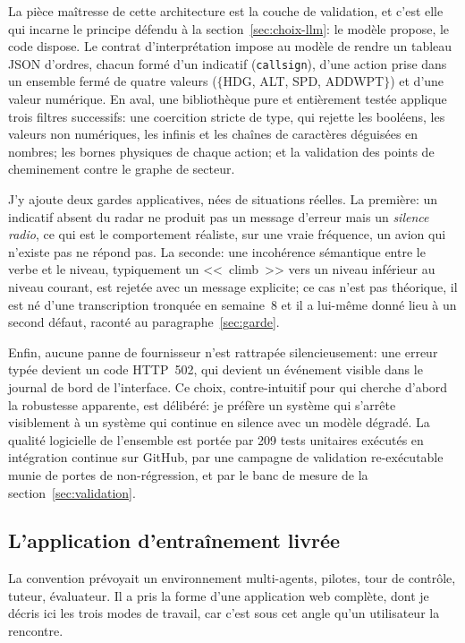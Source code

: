 \documentclass[11pt,a4paper]{article}
\begin{document}
La pièce maîtresse de cette architecture est la couche de validation, et c'est elle qui incarne le principe défendu à la section~\ref{sec:choix-llm}: le modèle propose, le code dispose. Le contrat d'interprétation impose au modèle de rendre un tableau JSON d'ordres, chacun formé d'un indicatif (\texttt{callsign}), d'une action prise dans un ensemble fermé de quatre valeurs ($\{$HDG, ALT, SPD, ADDWPT$\}$) et d'une valeur numérique. En aval, une bibliothèque pure et entièrement testée applique trois filtres successifs: une coercition stricte de type, qui rejette les booléens, les valeurs non numériques, les infinis et les chaînes de caractères déguisées en nombres; les bornes physiques de chaque action; et la validation des points de cheminement contre le graphe de secteur.

J'y ajoute deux gardes applicatives, nées de situations réelles. La première: un indicatif absent du radar ne produit pas un message d'erreur mais un \emph{silence radio}, ce qui est le comportement réaliste, sur une vraie fréquence, un avion qui n'existe pas ne répond pas. La seconde: une incohérence sémantique entre le verbe et le niveau, typiquement un <<~climb~>> vers un niveau inférieur au niveau courant, est rejetée avec un message explicite; ce cas n'est pas théorique, il est né d'une transcription tronquée en semaine~8 et il a lui-même donné lieu à un second défaut, raconté au paragraphe~\ref{sec:garde}. 

Enfin, aucune panne de fournisseur n'est rattrapée silencieusement: une erreur typée devient un code HTTP~502, qui devient un événement visible dans le journal de bord de l'interface. Ce choix, contre-intuitif pour qui cherche d'abord la robustesse apparente, est délibéré: je préfère un système qui s'arrête visiblement à un système qui continue en silence avec un modèle dégradé. La qualité logicielle de l'ensemble est portée par 209 tests unitaires exécutés en intégration continue sur GitHub, par une campagne de validation re-exécutable munie de portes de non-régression, et par le banc de mesure de la section~\ref{sec:validation}.

\subsection{L'application d'entraînement livrée}
\label{sec:app}

La convention prévoyait un environnement multi-agents, pilotes, tour de contrôle, tuteur, évaluateur. Il a pris la forme d'une application web complète, dont je décris ici les trois modes de travail, car c'est sous cet angle qu'un utilisateur la rencontre. 
\end{document}

